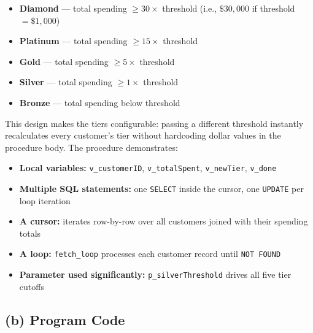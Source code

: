 \documentclass[12pt,letterpaper]{article}
\begin{document}
\begin{itemize}
    \item \textbf{Diamond} — total spending $\geq 30\times$ threshold (i.e., $\$30{,}000$ if threshold $= \$1{,}000$)
    \item \textbf{Platinum} — total spending $\geq 15\times$ threshold
    \item \textbf{Gold} — total spending $\geq 5\times$ threshold
    \item \textbf{Silver} — total spending $\geq 1\times$ threshold
    \item \textbf{Bronze} — total spending below threshold
\end{itemize}

This design makes the tiers configurable: passing a different threshold instantly recalculates every customer's tier without hardcoding dollar values in the procedure body. The procedure demonstrates:
\begin{itemize}
    \item \textbf{Local variables:} \texttt{v\_customerID}, \texttt{v\_totalSpent}, \texttt{v\_newTier}, \texttt{v\_done}
    \item \textbf{Multiple SQL statements:} one \texttt{SELECT} inside the cursor, one \texttt{UPDATE} per loop iteration
    \item \textbf{A cursor:} iterates row-by-row over all customers joined with their spending totals
    \item \textbf{A loop:} \texttt{fetch\_loop} processes each customer record until \texttt{NOT FOUND}
    \item \textbf{Parameter used significantly:} \texttt{p\_silverThreshold} drives all five tier cutoffs
\end{itemize}

\subsection*{(b) Program Code}
\end{document}
